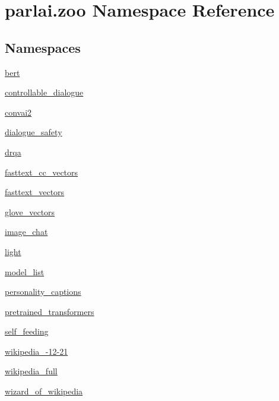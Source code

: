 \hypertarget{namespaceparlai_1_1zoo}{}\section{parlai.\+zoo Namespace Reference}
\label{namespaceparlai_1_1zoo}
\subsection*{Namespaces}
\begin{DoxyCompactItemize}
\item 
 \hyperlink{namespaceparlai_1_1zoo_1_1bert}{bert}
\item 
 \hyperlink{namespaceparlai_1_1zoo_1_1controllable__dialogue}{controllable\+\_\+dialogue}
\item 
 \hyperlink{namespaceparlai_1_1zoo_1_1convai2}{convai2}
\item 
 \hyperlink{namespaceparlai_1_1zoo_1_1dialogue__safety}{dialogue\+\_\+safety}
\item 
 \hyperlink{namespaceparlai_1_1zoo_1_1drqa}{drqa}
\item 
 \hyperlink{namespaceparlai_1_1zoo_1_1fasttext__cc__vectors}{fasttext\+\_\+cc\+\_\+vectors}
\item 
 \hyperlink{namespaceparlai_1_1zoo_1_1fasttext__vectors}{fasttext\+\_\+vectors}
\item 
 \hyperlink{namespaceparlai_1_1zoo_1_1glove__vectors}{glove\+\_\+vectors}
\item 
 \hyperlink{namespaceparlai_1_1zoo_1_1image__chat}{image\+\_\+chat}
\item 
 \hyperlink{namespaceparlai_1_1zoo_1_1light}{light}
\item 
 \hyperlink{namespaceparlai_1_1zoo_1_1model__list}{model\+\_\+list}
\item 
 \hyperlink{namespaceparlai_1_1zoo_1_1personality__captions}{personality\+\_\+captions}
\item 
 \hyperlink{namespaceparlai_1_1zoo_1_1pretrained__transformers}{pretrained\+\_\+transformers}
\item 
 \hyperlink{namespaceparlai_1_1zoo_1_1self__feeding}{self\+\_\+feeding}
\item 
 \hyperlink{namespaceparlai_1_1zoo_1_1wikipedia__2016-12-21}{wikipedia\+\_-\/12-\/21}
\item 
 \hyperlink{namespaceparlai_1_1zoo_1_1wikipedia__full}{wikipedia\+\_\+full}
\item 
 \hyperlink{namespaceparlai_1_1zoo_1_1wizard__of__wikipedia}{wizard\+\_\+of\+\_\+wikipedia}
\end{DoxyCompactItemize}
